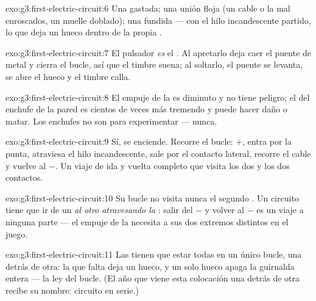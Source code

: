 \begin{solution}{exo:g3:first-electric-circuit:6}
Una  gastada; una unión floja (un cable o la  mal
enroscados, un muelle doblado); una  fundida --- con el hilo
incandescente partido, lo que deja un hueco dentro de la propia
.
\end{solution}

\begin{solution}{exo:g3:first-electric-circuit:7}
El pulsador \emph{es} el . Al apretarlo deja caer el
puente de metal y cierra el bucle, así que el timbre suena; al
soltarlo, el puente se levanta, se abre el hueco y el timbre calla.
\end{solution}

\begin{solution}{exo:g3:first-electric-circuit:8}
El empuje de la  es diminuto y no tiene peligro; el del enchufe
de la pared es cientos de veces más tremendo y puede hacer daño o
matar. Los enchufes no son para experimentar --- nunca.
\end{solution}

\begin{solution}{exo:g3:first-electric-circuit:9}
Sí, se enciende. Recorre el bucle:  $+$, entra por la
punta, atraviesa el hilo incandescente, sale por el contacto lateral,
recorre el cable y vuelve al $-$. Un viaje de ida y vuelta completo
que visita los dos  y los dos contactos.
\end{solution}

\begin{solution}{exo:g3:first-electric-circuit:10}
Su bucle no visita nunca el segundo . Un circuito tiene que ir
de un  \emph{al otro atravesando la }: salir del $-$ y
volver al $-$ es un viaje a ninguna parte --- el empuje de la
 necesita a sus dos extremos distintos en el juego.
\end{solution}

\begin{solution}{exo:g3:first-electric-circuit:11}
Las  tienen que estar todas en un único bucle, una detrás
de otra: la  que falta deja un hueco, y un solo hueco apaga
la guirnalda entera --- la ley del bucle. (El año que viene esta
colocación una detrás de otra recibe su nombre: circuito en serie.)
\end{solution}
